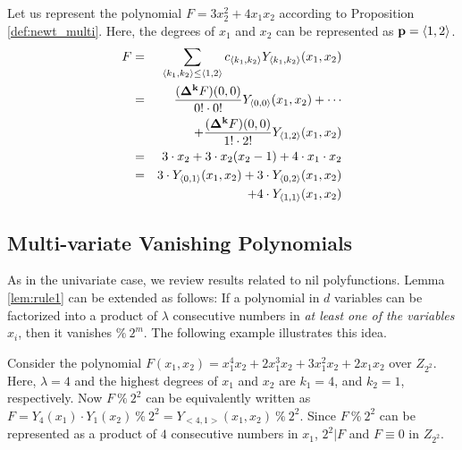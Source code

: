 \begin{Example}\label{ex:newt_multi}
Let us represent the polynomial $F = 3x_2^2 + 4x_1x_2$ according to
Proposition \ref{def:newt_multi}. Here, the degrees of $x_1$ and $x_2$ can be
represented as ${\bf p} = \langle 1,2 \rangle$. 
\begin{eqnarray}
F &=& \sum_{{\langle k_1, k_2 \rangle} \leq {\langle 1, 2
    \rangle}}c_{\langle k_1, k_2 \rangle} Y_{\langle k_1, k_2
    \rangle}(x_1, x_2) \nonumber \\
  &=& \frac{({\bf \Delta}^{{\bf k}}F)(0,0)}{0! \cdot 0!}Y_{\langle 0, 0
    \rangle}(x_1, x_2) + \cdots \nonumber \\
  & & + \frac{({\bf \Delta}^{{\bf k}}F)(0,0)}{1! \cdot 2!}Y_{\langle 1, 2
    \rangle}(x_1, x_2)\nonumber \\
  &=&  3 \cdot x_2 + 3 \cdot x_2(x_2 -1) + 4 \cdot x_1 \cdot x_2 \nonumber \\
  &=& 3 \cdot Y_{\langle 0, 1 \rangle}(x_1, x_2) + 3 \cdot Y_{\langle
    0, 2 \rangle}(x_1, x_2) \nonumber \\
  & & + 4 \cdot Y_{\langle 1, 1 \rangle}(x_1, x_2) \nonumber 
\end{eqnarray}
\end{Example}

\subsection{Multi-variate Vanishing Polynomials}
As in the univariate case, we review results related to nil
polyfunctions. Lemma \ref{lem:rule1} can be extended as follows: If a
polynomial in $d$ variables can be factorized into a product of
$\lambda$ consecutive numbers in {\it at least one of the variables}
$x_i$, then it vanishes $\% ~2^m$. The following example illustrates
this idea.

\begin{Example}\label{ex:rule1_multi}
Consider the polynomial $F(x_1, x_2) = x_1^4 x_2 + 2x_1^3 x_2 + 3x_1^2
x_2 + 2x_1 x_2$ over $Z_{2^2}$. Here, $\lambda = 4$ and the highest
degrees of $x_1$ and $x_2$ are $k_1 = 4$, and $k_2 = 1$,
respectively. Now $F ~\% ~2^2$ can be equivalently written as $F =
Y_{4}(x_1)\cdot Y_{1}(x_2) ~\% ~2^2 = Y_{<4,1>}(x_1, x_2) ~\% ~2^2
$. Since $F ~\% ~2^2$ can be represented as a product of $4$
consecutive numbers in $x_1$, $2^2|F$ and $F \equiv 0$ in $Z_{2^2}$.
\end{Example}

